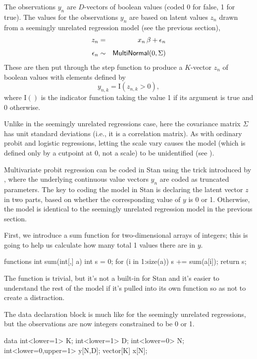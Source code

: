 The observations $y_n$ are $D$-vectors of boolean values (coded 0 for
false, 1 for true).  The values for the observations $y_n$ are based
on latent values $z_n$ drawn from a seemingly unrelated regression
model (see the previous section),
%
\begin{eqnarray*}
 z_n & = & x_n \, \beta + \epsilon_n
\\[4pt]
 \epsilon_n & \sim & \mbox{\sf MultiNormal}(0, \Sigma)
\end{eqnarray*}
%
These are then put through the step function to produce a $K$-vector $z_n$
of boolean values with elements defined by
\[
y_{n, k} = \mathrm{I}(z_{n, k} > 0),
\]
where $\mathrm{I}()$ is the indicator function taking the value 1 if its
argument is true and 0 otherwise.

Unlike in the seemingly unrelated regressions case, here the
covariance matrix $\Sigma$ has unit standard deviations (i.e., it is a
correlation matrix).  As with ordinary probit and logistic
regressions, letting the scale vary causes the model (which is defined
only by a cutpoint at 0, not a scale) to be unidentified (see
\citep{Greene:2011}).

Multivariate probit regression can be coded in Stan using the trick
introduced by \cite{AlbertChib:1993}, where the underlying continuous
value vectors $y_n$ are coded as truncated parameters.  The key to
coding the model in Stan is declaring the latent vector $z$ in two
parts, based on whether the corresponding value of $y$ is 0 or 1.
Otherwise, the model is identical to the seemingly unrelated
regression model in the previous section.

First, we introduce a sum function for two-dimensional arrays of
integers;  this is going to help us calculate how many total 1 values
there are in $y$.
%
\begin{stancode}
functions {
  int sum(int[,] a) {
    int s = 0;
    for (i in 1:size(a))
      s += sum(a[i]);
    return s;
  }
}
\end{stancode}
%
The function is trivial, but it's not a built-in for Stan and it's easier to
understand the rest of the model if it's pulled into its own function
so as not to create a distraction.

The data declaration block is much like for the seemingly unrelated
regressions, but the observations  are now integers
constrained to be 0 or 1.
%
\begin{stancode}
data {
  int<lower=1> K;
  int<lower=1> D;
  int<lower=0> N;
  int<lower=0,upper=1> y[N,D];
  vector[K] x[N];
}
\end{stancode}

